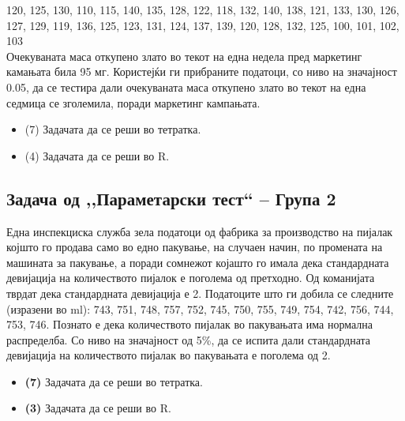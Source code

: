 \documentclass[a4paper, 12pt]{article}
\begin{document}
120, 125, 130, 110, 115, 140, 135, 128, 122, 118, 132, 140, 138, 121, 133, 130, 126, 127, 129, 119, 136, 125, 123, 131, 124, 137, 139, 120, 128, 132, 125, 100, 101, 102, 103\\


Очекуваната маса откупено злато во текот на една недела пред маркетинг камањата била 95 мг. Користејќи ги прибраните податоци, со ниво на значајност 0.05, да се тестира дали очекуваната маса откупено злато во текот на една седмица се зголемила, поради маркетинг кампањата.
\begin{itemize}
  \item [а)] (7) Задачата да се реши во тетратка.
  \item [б)] (4) Задачата да се реши во R.
\end{itemize}

\subsection*{Задача од ,,Параметарски тест`` – Група 2}
Една инспекциска служба зела податоци од фабрика за производство на пијалак којшто го продава само во едно пакување, на случаен начин, по промената на машината за пакување, а поради сомнежот којашто го имала дека стандардната девијација на количеството пијалок е поголема од претходно. Од команијата тврдат дека стандардната девијација е 2. Податоците што ги добила се следните (изразени во ml): 
743, 751, 748, 757, 752, 745, 750, 755, 749, 754, 742, 756, 744, 753, 746. 
Познато е дека количеството пијалак во пакувањата има нормална распределба. Со ниво на значајност од 5\%, да се испита дали стандардната девијација на количеството пијалак во пакувањата е поголема од 2.

\begin{itemize}
  \item [а)] \textbf{(7)} Задачата да се реши во тетратка. 
  \item [б)] \textbf{(3)} Задачата да се реши во R.
\end{itemize}
\end{document}

